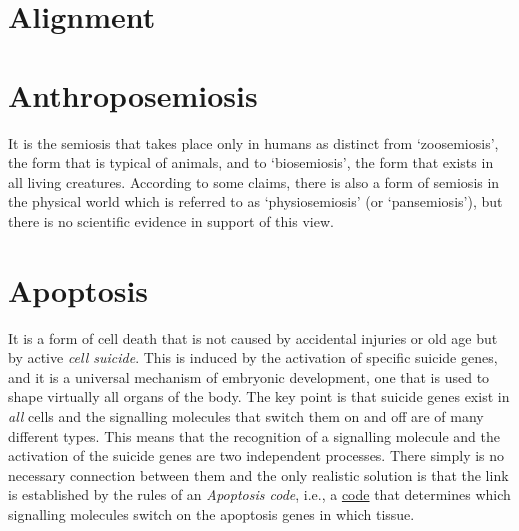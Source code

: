 \documentclass[12pt]{article}
\begin{document}
\hypertarget{alignment}{}
\section{Alignment}
 
\hypertarget{anthroposemiosis}{}
\section{Anthroposemiosis }
It is the semiosis that takes place only in humans as distinct from `zoosemiosis', the form that is typical of animals, and to `biosemiosis', the form that exists in all living creatures. According to some claims, there is also a form of semiosis in the physical world which is referred to as `physiosemiosis' (or `pansemiosis'), but there is no scientific evidence in support of this view.


\hypertarget{apoptosis}{}
\section{Apoptosis}
It is a form of cell death that is not caused by accidental injuries or old age but by active \textit{cell suicide}. This is induced by the activation of specific suicide genes, and it is a universal mechanism of embryonic development, one that is used to shape virtually all organs of the body. The key point is that suicide genes exist in \textit{all} cells and the signalling molecules that switch them on and off are of many different types. This means that the recognition of a signalling molecule and the activation of the suicide genes are two independent processes. There simply is no necessary connection between them and the only realistic solution is that the link is established by the rules of an \textit{Apoptosis code}, i.e., a \hyperlink{code}{code} that determines which signalling molecules switch on the apoptosis genes in which tissue.


\hypertarget{arbitrariness}{}
\end{document}
